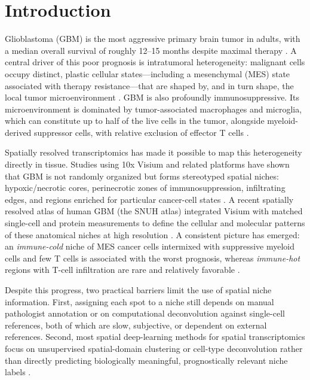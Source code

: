 \documentclass[11pt,letterpaper]{article}
\begin{document}
\vspace{1em}

\section{Introduction}

Glioblastoma (GBM) is the most aggressive primary brain tumor in adults, with a median overall survival of roughly 12--15 months despite maximal therapy \cite{tcga2008}. A central driver of this poor prognosis is intratumoral heterogeneity: malignant cells occupy distinct, plastic cellular states---including a mesenchymal (MES) state associated with therapy resistance---that are shaped by, and in turn shape, the local tumor microenvironment \cite{neftel2019,greenwald2024}. GBM is also profoundly immunosuppressive. Its microenvironment is dominated by tumor-associated macrophages and microglia, which can constitute up to half of the live cells in the tumor, alongside myeloid-derived suppressor cells, with relative exclusion of effector T cells \cite{khan2023,lin2024,decordova2020}.

Spatially resolved transcriptomics has made it possible to map this heterogeneity directly in tissue. Studies using 10x Visium and related platforms have shown that GBM is not randomly organized but forms stereotyped spatial niches: hypoxic/necrotic cores, perinecrotic zones of immunosuppression, infiltrating edges, and regions enriched for particular cancer-cell states \cite{ravi2022,greenwald2024,stahl2016}. A recent spatially resolved atlas of human GBM (the SNUH atlas) integrated Visium with matched single-cell and protein measurements to define the cellular and molecular patterns of these anatomical niches at high resolution \cite{park2026}. A consistent picture has emerged: an \emph{immune-cold} niche of MES cancer cells intermixed with suppressive myeloid cells and few T cells is associated with the worst prognosis, whereas \emph{immune-hot} regions with T-cell infiltration are rare and relatively favorable \cite{greenwald2024,lin2024}.

Despite this progress, two practical barriers limit the use of spatial niche information. First, assigning each spot to a niche still depends on manual pathologist annotation or on computational deconvolution against single-cell references, both of which are slow, subjective, or dependent on external references. Second, most spatial deep-learning methods for spatial transcriptomics focus on unsupervised spatial-domain clustering or cell-type deconvolution rather than directly predicting biologically meaningful, prognostically relevant niche labels \cite{xu2023spacel,peng2023,liu2023review}.
\end{document}
